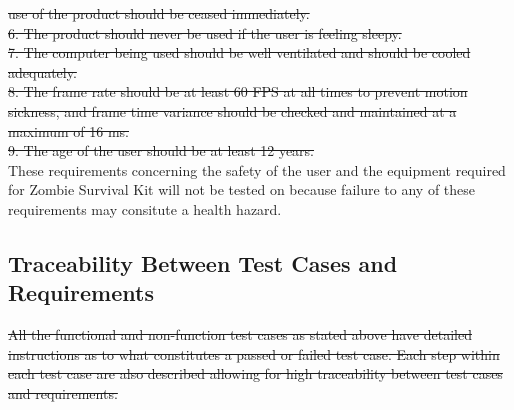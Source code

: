 \documentclass[12pt, titlepage]{article}
\begin{document}
\begin{enumerate}
	\sout{use of the product should be ceased immediately.}\\
	
	\sout{6. The product should never be used if the user is feeling sleepy.}\\
	
	\sout{7. The computer being used should be well ventilated and should be cooled adequately.}\\
	
	\sout{8. The frame rate should be at least 60 FPS at all times to prevent motion sickness, and frame time variance should be checked and maintained at a maximum of 16 ms.}\\
	
	\sout{9. The age of the user should be at least 12 years.} \\
	
	These requirements concerning the safety of the user and the equipment required for Zombie Survival Kit will not be tested on because failure to any of these requirements may consitute a health hazard.\\
	
	
\end{enumerate}

\subsection{Traceability Between Test Cases and Requirements}
\sout{All the functional and non-function test cases as stated above have detailed instructions as to what constitutes a passed or failed test case. Each step within each test case are also described allowing for high traceability between test cases and requirements.}\\
\end{document}
